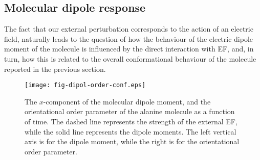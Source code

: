 \documentclass[a4paper,preprint,unsortedaddress,onecolumn]{revtex4-1}
\newcommand{\recheck}[1]{{\color{red} #1}}
\begin{document}
\subsection{Molecular dipole response}
\recheck{The fact that our external perturbation corresponds to the action of an electric field, naturally leads to the question of how the behaviour of the electric dipole moment of the molecule is influenced by the direct interaction with EF, and, in turn, how this is related to the overall conformational behaviour of the molecule reported in the previous section.}
\begin{figure}
  \centering
  \texttt{[image: fig-dipol-order-conf.eps]}
  \caption{The
    $x$-component of the molecular dipole moment, and the orientational order parameter
    of the alanine molecule as a
    function of time. The dashed line represents the strength of the
    external EF, while the solid line represents the dipole
    moments. The left vertical axis is for the dipole moment, while
    the right is for the orientational order parameter.
  }
  \label{fig:tmp3}
\end{figure}
\end{document}
